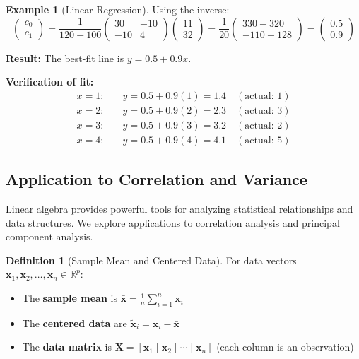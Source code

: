 \documentclass[12pt]{article}
\numberwithin{equation}{section}
\newcommand{\vect}[1]{\boldsymbol{#1}}   %
\newcommand{\mat}[1]{\mathbf{#1}}        %
\theoremstyle{plain}
\theoremstyle{definition}
\newtheorem{definition}[theorem]{Definition}
\newtheorem{example}[theorem]{Example}
\theoremstyle{remark}
\begin{document}
\begin{example}[Linear Regression]
Using the inverse:
$$\begin{pmatrix} c_0 \\ c_1 \end{pmatrix} = \frac{1}{120-100}\begin{pmatrix} 30 & -10 \\ -10 & 4 \end{pmatrix}\begin{pmatrix} 11 \\ 32 \end{pmatrix} = \frac{1}{20}\begin{pmatrix} 330-320 \\ -110+128 \end{pmatrix} = \begin{pmatrix} 0.5 \\ 0.9 \end{pmatrix}$$

\textbf{Result:} The best-fit line is $y = 0.5 + 0.9x$.

\textbf{Verification of fit:}
\begin{align}
x = 1: &\quad y = 0.5 + 0.9(1) = 1.4 \quad (\text{actual: } 1)\\
x = 2: &\quad y = 0.5 + 0.9(2) = 2.3 \quad (\text{actual: } 3)\\
x = 3: &\quad y = 0.5 + 0.9(3) = 3.2 \quad (\text{actual: } 2)\\
x = 4: &\quad y = 0.5 + 0.9(4) = 4.1 \quad (\text{actual: } 5)
\end{align}
\end{example}

\subsection{Application to Correlation and Variance}

Linear algebra provides powerful tools for analyzing statistical relationships and data structures. We explore applications to correlation analysis and principal component analysis.

\begin{definition}[Sample Mean and Centered Data]
For data vectors $\vect{x}_1, \vect{x}_2, \ldots, \vect{x}_n \in \mathbb{R}^p$:
\begin{itemize}
\item The \textbf{sample mean} is $\bar{\vect{x}} = \frac{1}{n}\sum_{i=1}^n \vect{x}_i$
\item The \textbf{centered data} are $\tilde{\vect{x}}_i = \vect{x}_i - \bar{\vect{x}}$
\item The \textbf{data matrix} is $\mat{X} = [\vect{x}_1 \mid \vect{x}_2 \mid \cdots \mid \vect{x}_n]$ (each column is an observation)
\end{itemize}
\end{definition}
\end{document}
